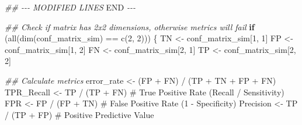 \documentclass[
  letterpaper,
]{scrbook}
\newenvironment{Shaded}{\begin{snugshade}}{\end{snugshade}}
\newcommand{\CommentTok}[1]{\textcolor[rgb]{0.37,0.37,0.37}{#1}}
\newcommand{\ControlFlowTok}[1]{\textcolor[rgb]{0.00,0.23,0.31}{\textbf{#1}}}
\newcommand{\DecValTok}[1]{\textcolor[rgb]{0.68,0.00,0.00}{#1}}
\newcommand{\DocumentationTok}[1]{\textcolor[rgb]{0.37,0.37,0.37}{\textit{#1}}}
\newcommand{\FunctionTok}[1]{\textcolor[rgb]{0.28,0.35,0.67}{#1}}
\newcommand{\NormalTok}[1]{\textcolor[rgb]{0.00,0.23,0.31}{#1}}
\newcommand{\OtherTok}[1]{\textcolor[rgb]{0.00,0.23,0.31}{#1}}
\newcommand{\RegionMarkerTok}[1]{\textcolor[rgb]{0.00,0.23,0.31}{#1}}
\newcommand{\SpecialCharTok}[1]{\textcolor[rgb]{0.37,0.37,0.37}{#1}}
\begin{document}
\begin{Shaded}
\begin{Highlighting}[]
\DocumentationTok{\#\# {-}{-}{-} MODIFIED LINES }\RegionMarkerTok{END}\DocumentationTok{ {-}{-}{-}}


\DocumentationTok{\#\# Check if matrix has 2x2 dimensions, otherwise metrics will fail}
\ControlFlowTok{if}\NormalTok{ (}\FunctionTok{all}\NormalTok{(}\FunctionTok{dim}\NormalTok{(conf\_matrix\_sim) }\SpecialCharTok{==} \FunctionTok{c}\NormalTok{(}\DecValTok{2}\NormalTok{, }\DecValTok{2}\NormalTok{))) \{}
\NormalTok{  TN }\OtherTok{\textless{}{-}}\NormalTok{ conf\_matrix\_sim[}\DecValTok{1}\NormalTok{, }\DecValTok{1}\NormalTok{]}
\NormalTok{  FP }\OtherTok{\textless{}{-}}\NormalTok{ conf\_matrix\_sim[}\DecValTok{1}\NormalTok{, }\DecValTok{2}\NormalTok{]}
\NormalTok{  FN }\OtherTok{\textless{}{-}}\NormalTok{ conf\_matrix\_sim[}\DecValTok{2}\NormalTok{, }\DecValTok{1}\NormalTok{]}
\NormalTok{  TP }\OtherTok{\textless{}{-}}\NormalTok{ conf\_matrix\_sim[}\DecValTok{2}\NormalTok{, }\DecValTok{2}\NormalTok{]}

  \DocumentationTok{\#\# Calculate metrics}
\NormalTok{  error\_rate }\OtherTok{\textless{}{-}}\NormalTok{ (FP }\SpecialCharTok{+}\NormalTok{ FN) }\SpecialCharTok{/}\NormalTok{ (TP }\SpecialCharTok{+}\NormalTok{ TN }\SpecialCharTok{+}\NormalTok{ FP }\SpecialCharTok{+}\NormalTok{ FN)}
\NormalTok{  TPR\_Recall }\OtherTok{\textless{}{-}}\NormalTok{ TP }\SpecialCharTok{/}\NormalTok{ (TP }\SpecialCharTok{+}\NormalTok{ FN) }\CommentTok{\# True Positive Rate (Recall / Sensitivity)}
\NormalTok{  FPR }\OtherTok{\textless{}{-}}\NormalTok{ FP }\SpecialCharTok{/}\NormalTok{ (FP }\SpecialCharTok{+}\NormalTok{ TN)      }\CommentTok{\# False Positive Rate (1 {-} Specificity)}
\NormalTok{  Precision }\OtherTok{\textless{}{-}}\NormalTok{ TP }\SpecialCharTok{/}\NormalTok{ (TP }\SpecialCharTok{+}\NormalTok{ FP)  }\CommentTok{\# Positive Predictive Value}


\end{Highlighting}
\end{Shaded}
\end{document}
